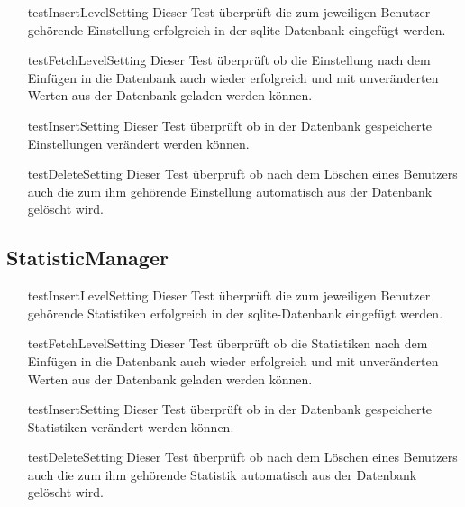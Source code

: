 \begin{itemize}

\item[testInsertLevelSetting]
Dieser Test überprüft die zum jeweiligen Benutzer gehörende Einstellung erfolgreich in der sqlite-Datenbank eingefügt werden. 

\item[testFetchLevelSetting]
Dieser Test überprüft ob die Einstellung nach dem Einfügen in die Datenbank auch wieder erfolgreich und mit unveränderten Werten aus der Datenbank geladen werden können.

\item[testInsertSetting]
Dieser Test überprüft ob in der Datenbank gespeicherte Einstellungen verändert werden können.

\item[testDeleteSetting]
Dieser Test überprüft ob nach dem Löschen eines Benutzers auch die zum ihm gehörende Einstellung automatisch aus der Datenbank gelöscht wird.

\end{itemize}

\subsection{StatisticManager}

\begin{itemize}

\item[testInsertLevelSetting]
Dieser Test überprüft die zum jeweiligen Benutzer gehörende Statistiken erfolgreich in der sqlite-Datenbank eingefügt werden. 

\item[testFetchLevelSetting]
Dieser Test überprüft ob die Statistiken nach dem Einfügen in die Datenbank auch wieder erfolgreich und mit unveränderten Werten aus der Datenbank geladen werden können.

\item[testInsertSetting]
Dieser Test überprüft ob in der Datenbank gespeicherte Statistiken verändert werden können.

\item[testDeleteSetting]
Dieser Test überprüft ob nach dem Löschen eines Benutzers auch die zum ihm gehörende Statistik automatisch aus der Datenbank gelöscht wird.

\end{itemize}


